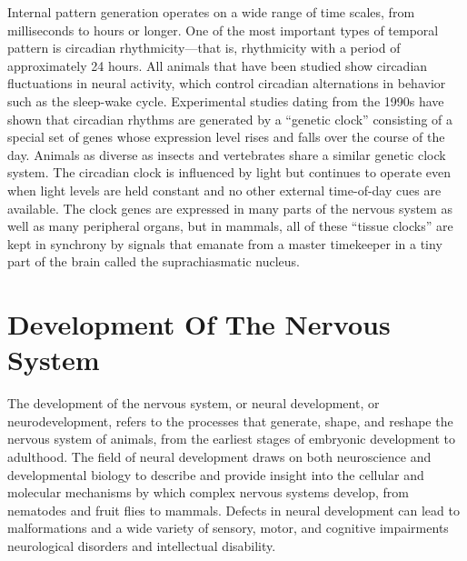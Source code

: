 \documentclass[]{book}
\begin{document}
Internal pattern generation operates on a wide range of time scales, from milliseconds to hours or longer. One of the most important types of temporal pattern is circadian rhythmicity---that is, rhythmicity with a period of approximately 24 hours. All animals that have been studied show circadian fluctuations in neural activity, which control circadian alternations in behavior such as the sleep-wake cycle. Experimental studies dating from the 1990s have shown that circadian rhythms are generated by a ``genetic clock'' consisting of a special set of genes whose expression level rises and falls over the course of the day. Animals as diverse as insects and vertebrates share a similar genetic clock system. The circadian clock is influenced by light but continues to operate even when light levels are held constant and no other external time-of-day cues are available. The clock genes are expressed in many parts of the nervous system as well as many peripheral organs, but in mammals, all of these ``tissue clocks'' are kept in synchrony by signals that emanate from a master timekeeper in a tiny part of the brain called the suprachiasmatic nucleus.

\hypertarget{development-of-the-nervous-system-1}{%
\chapter{Development Of The Nervous System}\label{development-of-the-nervous-system-1}}

The development of the nervous system, or neural development, or neurodevelopment, refers to the processes that generate, shape, and reshape the nervous system of animals, from the earliest stages of embryonic development to adulthood. The field of neural development draws on both neuroscience and developmental biology to describe and provide insight into the cellular and molecular mechanisms by which complex nervous systems develop, from nematodes and fruit flies to mammals. Defects in neural development can lead to malformations and a wide variety of sensory, motor, and cognitive impairments neurological disorders and intellectual disability.
\end{document}

